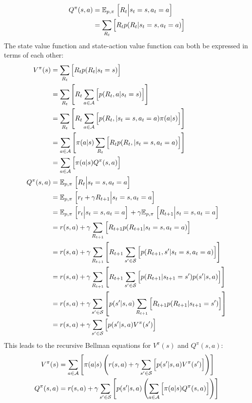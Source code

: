 \begin{align*}
    Q^\pi(s, a) &= \mathbb{E}_{p, \pi} \left.\Bigl[ R_t \middle\vert s_t=s, a_t=a \Bigr]\right. \\
    &= \sum_{R_t}{\Bigl[ R_t p(R_t\vert s_t=s, a_t=a) \Bigr]}
\end{align*}
The state value function and state-action value function can both be expressed in terms of each other:
\begin{align*}
    V^\pi(s) &= \sum_{R_t}{\Bigl[ R_t p(R_t\vert s_t=s) \Bigr]} \\
    &= \sum_{R_t}{\left[ R_t \sum_{a\in\mathcal{A}}{\Bigl[p(R_t, a\vert s_t=s) \Bigr]} \right]} \\
    &= \sum_{R_t}{\left[ R_t \sum_{a\in\mathcal{A}}{\Bigl[p(R_t, \vert s_t=s, a_t=a) \pi(a\vert s) \Bigr]} \right]} \\
    &= \sum_{a\in\mathcal{A}}{\left[ \pi(a\vert s) \sum_{R_t}{\Bigl[R_t p(R_t, \vert s_t=s, a_t=a) \Bigr]} \right]} \\
    &= \sum_{a\in\mathcal{A}}{\Bigl[ \pi(a\vert s) Q^\pi(s, a) \Bigr]} \\
    Q^\pi(s, a) &= \mathbb{E}_{p, \pi} \left.\Bigl[ R_t \middle\vert s_t=s, a_t=a \Bigr]\right. \\
    &= \mathbb{E}_{p, \pi} \left.\Bigl[ r_t + \gamma R_{t+1} \middle\vert s_t=s, a_t=a \Bigr]\right. \\
    &= \mathbb{E}_{p, \pi} \left.\Bigl[ r_t \middle\vert s_t=s, a_t=a \Bigr]\right. + \gamma\mathbb{E}_{p, \pi} \left.\Bigl[ R_{t+1} \middle\vert s_t=s, a_t=a \Bigr]\right. \\
    &= r(s, a) + \gamma\sum_{R_{t+1}}{\Bigl[ R_{t+1} p(R_{t+1}\vert s_t=s, a_t=a) \Bigr]} \\
    &= r(s, a) + \gamma\sum_{R_{t+1}}{\left[ R_{t+1} \sum_{s'\in\mathcal{S}}{ \Bigl[ p(R_{t+1}, s'\vert s_t=s, a_t=a) \Bigr] } \right]} \\
    &= r(s, a) + \gamma\sum_{R_{t+1}}{\left[ R_{t+1} \sum_{s'\in\mathcal{S}}{ \Bigl[ p(R_{t+1}\vert s_{t+1}=s')p(s'\vert s, a) \Bigr] } \right]} \\
    &= r(s, a) + \gamma\sum_{s'\in\mathcal{S}}{\left[ p(s'\vert s, a) \sum_{R_{t+1}}{ \Bigl[ R_{t+1} p(R_{t+1}\vert s_{t+1}=s') \Bigr] } \right]} \\
    &= r(s, a) + \gamma\sum_{s'\in\mathcal{S}}{\Bigl[ p(s'\vert s, a) V^\pi(s') \Bigr]}
\end{align*}
This leads to the recursive Bellman equations for $V^\pi(s)$ and $Q^\pi(s, a)$:
\begin{align*}
    V^\pi(s) &= \sum_{a\in\mathcal{A}}{\left[ \pi(a\vert s) \left( r(s, a) + \gamma\sum_{s'\in\mathcal{S}}{\Bigl[ p(s'\vert s, a) V^\pi(s') \Bigr]} \right) \right]} \\
    Q^\pi(s, a) &= r(s, a) + \gamma\sum_{s'\in\mathcal{S}}{\left[ p(s'\vert s, a) \left( \sum_{a\in\mathcal{A}}{\Bigl[ \pi(a\vert s) Q^\pi(s, a) \Bigr]} \right) \right]}
\end{align*}

